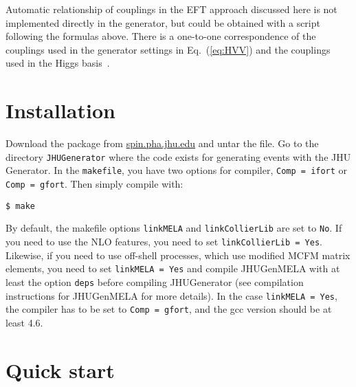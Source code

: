 \documentclass[aps,superscriptaddress,nofootinbib]{revtex4}
\begin{document}
Automatic relationship of couplings in the EFT approach discussed here is not implemented directly in the generator, 
but could be obtained with a script following the formulas above. 
There is a one-to-one correspondence of the couplings used in the generator settings in Eq.~(\ref{eq:HVV}) 
and the couplings used in the Higgs basis~\cite{deFlorian:2016spz}. 

\section{Installation}

\noindent
Download the package from \url{spin.pha.jhu.edu} and untar the file.  Go to the directory \verb|JHUGenerator| where the code exists for generating events with the JHU Generator. In the \verb|makefile|, you have two options for compiler, \verb|Comp = ifort| or \verb|Comp = gfort|.  Then simply compile with:
\begin{verbatim}
$ make
\end{verbatim}

By default, the makefile options \verb|linkMELA| and \verb|linkCollierLib| are set to \verb|No|. If you need to use the NLO features, you need to set \verb|linkCollierLib = Yes|. Likewise, if you need to use off-shell processes, which use modified MCFM matrix elements, you need to set \verb|linkMELA = Yes| and compile JHUGenMELA with at least the option \verb|deps| before compiling JHUGenerator (see compilation instructions for JHUGenMELA for more details). In the case \verb|linkMELA = Yes|, the compiler has to be set to \verb|Comp = gfort|, and the gcc version should be at least 4.6.

\section{Quick start}
\end{document}
